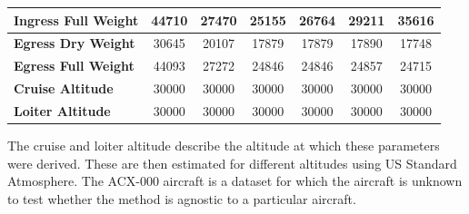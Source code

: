 \begin{table}[H]
{\begin{tabular}{|l|c|c|c|c|c|c|}
\textbf{Ingress Full Weight}  & 44710          & 27470          & 25155            & 26764            & 29211            & 35616            \\ \hline
\textbf{Egress Dry Weight}  & 30645          & 20107          & 17879            & 17879            & 17890            & 17748            \\ \hline
\textbf{Egress Full Weight} & 44093          & 27272          & 24846            & 24846            & 24857            & 24715            \\ \hline
\textbf{Cruise Altitude}     & 30000          & 30000          & 30000            & 30000            & 30000            & 30000            \\ \hline
\textbf{Loiter Altitude}     & 30000          & 30000          & 30000            & 30000            & 30000            & 30000            \\ \hline
\end{tabular}
}
\end{table}
The cruise and loiter altitude describe the altitude at which these parameters were derived. These are then estimated for different altitudes using US Standard Atmosphere. The ACX-000 aircraft is a dataset for which the aircraft is unknown to test whether the method is agnostic to a particular aircraft.

